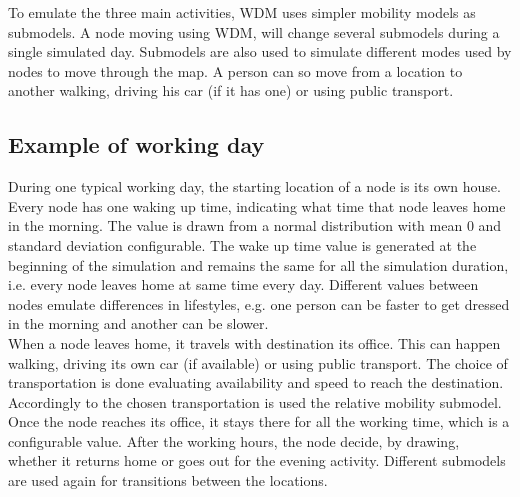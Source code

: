 To emulate the three main activities, WDM uses simpler mobility models as submodels. A node moving using WDM, will change several submodels during a single simulated day. Submodels are also used to simulate different modes used by nodes to move through the map. A person can so move from a location to another walking, driving his car (if it has one) or using public transport.
\\


\subsection{Example of working day}
During one typical working day, the starting location of a node is its own house. Every node has one waking up time, indicating what time that node leaves home in the morning. The value is drawn from a normal distribution with mean 0 and standard deviation configurable. The wake up time value is generated at the beginning of the simulation and remains the same for all the simulation duration, i.e. every node leaves home at same time every day. Different values between nodes emulate differences in lifestyles, e.g. one person can be faster to get dressed in the morning and another can be slower.
\\ 

When a node leaves home, it travels with destination its office. This can happen walking, driving its own car (if available) or using public transport. The choice of transportation is done evaluating availability and speed to reach the destination. Accordingly to the chosen transportation is used the relative mobility submodel.
\\

Once the node reaches its office, it stays there for all the working time, which is a configurable value. After the working hours, the node decide, by drawing, whether it returns home or goes out for the evening activity. Different submodels are used again for transitions between the locations.


